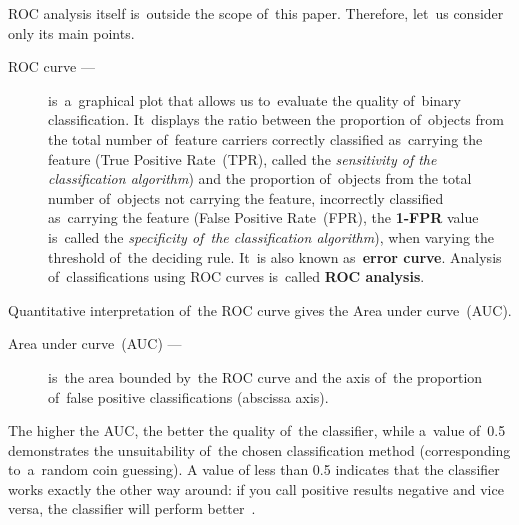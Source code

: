 \documentclass[]{scrreprt}
\begin{document}
ROC analysis itself is~outside the scope of~this paper. Therefore, let~us consider only its main points.
\begin{description}
	\item[ROC curve ---] is~a~graphical plot that allows us to~evaluate the quality of~binary classification. It~displays the ratio between the proportion of~objects from the total number of~feature carriers correctly classified as~carrying the feature (True Positive Rate~(TPR), called the \emph{sensitivity of the classification algorithm}) and the proportion of~objects from the total number of~objects not carrying the feature, incorrectly classified as~carrying the feature (False Positive Rate~(FPR), the \textbf{1-FPR} value is~called the \emph{specificity of~the classification algorithm}), when varying the threshold of~the deciding rule.	It~is also known as~\textbf{error curve}. Analysis of~classifications using ROC curves is~called \textbf{ROC analysis}.
\end{description}
Quantitative interpretation of~the ROC curve gives the Area under curve~(AUC).
\begin{description}
	\item[Area under curve~(AUC) ---] is~the area bounded by~the ROC curve and the axis of~the proportion of~false positive classifications (abscissa axis).
\end{description}
The higher the AUC, the better the quality of~the classifier, while a~value of~0.5 demonstrates the unsuitability of~the chosen classification method (corresponding to~a~random coin guessing). A value of less than 0.5 indicates that the classifier works exactly the other way around: if you call positive results negative and vice versa, the classifier will perform better~\cite{Wiki:ROC}.
\end{document}
